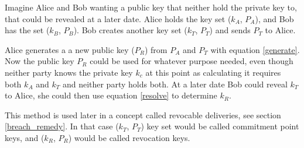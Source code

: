 Imagine Alice and Bob wanting a public key that neither hold the private key to, that could be revealed at a later date. Alice holds the key set ($k_A$, $P_A$), and Bob has the set ($k_B$, $P_B$). Bob creates another key set ($k_T$, $P_T$) and sends $P_T$ to Alice.

Alice generates a a new public key ($P_R$) from $P_A$ and $P_T$ with equation \ref{generate}. Now the public key $P_R$ could be used for whatever purpose needed, even though neither party knows the private key $k_c$ at this point as calculating it requires both $k_A$ and $k_T$ and neither party holds both. At a later date Bob could reveal $k_T$ to Alice, she could then use equation \ref{resolve} to determine $k_R$.\cite{bolt}

This method is used later in a concept called revocable deliveries, see section \ref{breach_remedy}. In that case ($k_T$, $P_T$) key set would be called commitment point keys, and ($k_R$, $P_R$) would be called revocation keys.\cite{bolt}